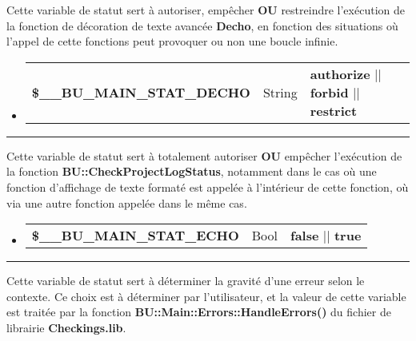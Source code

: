\documentclass[a4paper,10pt]{article}
\begin{document}
\begin{justify}
    Cette variable de statut sert à autoriser, empêcher \textbf{OU} restreindre l'exécution de la fonction de décoration de texte avancée \textbf{\color{mauve}Decho}, en fonction des situations où l'appel de cette fonctions peut provoquer ou non une boucle infinie.
\end{justify}

\begin{justify}
     \begin{itemize}
        \item
        {
            \begin{tabular}{l|l|l}
                \textbf{\color{orange}\$\_\_BU\_MAIN\_STAT\_DECHO}  & String    & \textbf{authorize} || \textbf{forbid} || \textbf{restrict}\\[1\baselineskip]
            \end{tabular}
        }
    \end{itemize}
\end{justify}


\par\noindent\rule{\textwidth}{0.4pt}

\begin{justify}
    Cette variable de statut sert à totalement autoriser \textbf{OU} empêcher l'exécution de la fonction \textbf{\color{mauve}BU::CheckProjectLogStatus}, notamment dans le cas où une fonction d'affichage de texte formaté est appelée à l'intérieur de cette fonction, où via une autre fonction appelée dans le même cas.
\end{justify}

\begin{justify}
     \begin{itemize}
        \item
        {
            \begin{tabular}{l|l|l}
                \textbf{\color{orange}\$\_\_BU\_MAIN\_STAT\_ECHO}   & Bool      & \textbf{false} || \textbf{true}\\[1\baselineskip]
            \end{tabular}
        }
    \end{itemize}
\end{justify}


\par\noindent\rule{\textwidth}{0.4pt}

\begin{justify}
    Cette variable de statut sert à déterminer la gravité d'une erreur selon le contexte. Ce choix est à déterminer par l'utilisateur, et la valeur de cette variable est traitée par la fonction \textbf{\color{mauve}BU::Main::Errors::HandleErrors()} du fichier de librairie \textbf{\color{lime}Checkings.lib}.
\end{justify}
\end{document}
